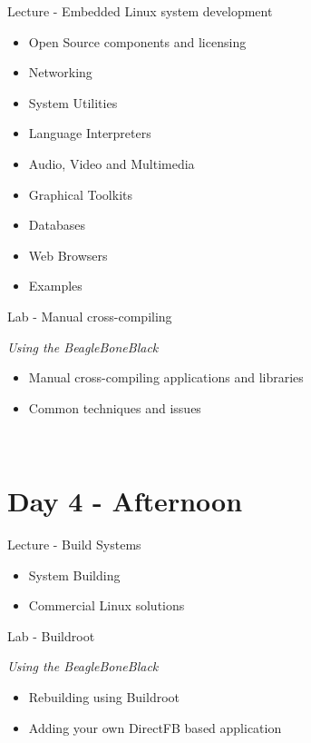 \documentclass[a4paper,12pt,obeyspaces,spaces,hyphens]{article}
\begin{document}
\feagendatwocolumn
{Lecture - Embedded Linux system development}
{
  \begin{itemize}
  \item Open Source components and licensing
  \item Networking
  \item System Utilities
  \item Language Interpreters
  \item Audio, Video and Multimedia
  \item Graphical Toolkits
  \item Databases
  \item Web Browsers
  \item Examples
  \end{itemize}
}
{Lab - Manual cross-compiling}
{
  {\em Using the BeagleBoneBlack}
  \begin{itemize}
  \item Manual cross-compiling applications and libraries
  \item Common techniques and issues
  \end{itemize}
}
\\
\section{Day 4 - Afternoon}
\feagendatwocolumn
{Lecture - Build Systems}
{
  \begin{itemize}
  \item System Building
  \item Commercial Linux solutions
  \end{itemize}
}
{Lab - Buildroot}
{
  {\em Using the BeagleBoneBlack}
  \begin{itemize}
  \item Rebuilding using Buildroot
  \item Adding your own DirectFB based application
  \end{itemize}
}

\clearpage
\end{document}
